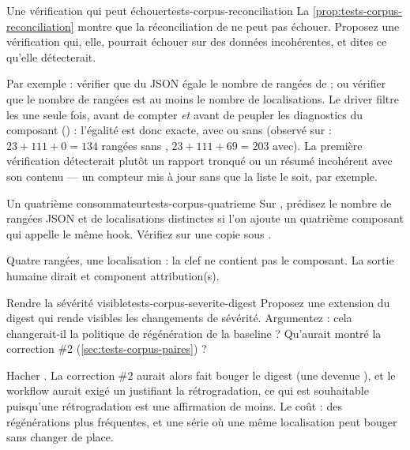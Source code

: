 \begin{exercice}{Une vérification qui peut échouer}{tests-corpus-reconciliation}
La \cref{prop:tests-corpus-reconciliation} montre que la réconciliation de  ne peut pas échouer. Proposez une vérification qui, elle, pourrait échouer sur des données incohérentes, et dites ce qu'elle détecterait.
\end{exercice}
\begin{solution}
Par exemple : vérifier que  du JSON égale le nombre de rangées de  ; ou vérifier que le nombre de rangées est au moins le nombre de localisations. Le driver filtre les \Info{} une seule fois, avant de compter \emph{et} avant de peupler les diagnostics du composant () : l'égalité est donc exacte, avec ou sans  (observé sur  : $23+111+0=134$ rangées sans , $23+111+69=203$ avec). La première vérification détecterait plutôt un rapport tronqué ou un résumé incohérent avec son contenu — un compteur mis à jour sans que la liste le soit, par exemple.
\end{solution}

\begin{exercice}{Un quatrième consommateur}{tests-corpus-quatrieme}
Sur , prédisez le nombre de rangées JSON et de localisations distinctes si l'on ajoute un quatrième composant qui appelle le même hook. Vérifiez sur une copie sous .
\end{exercice}
\begin{solution}
Quatre rangées, une localisation : la clef ne contient pas le composant. La sortie humaine dirait \og [in 4 components]\fg{} et  component attribution(s)\fg{}.
\end{solution}

\begin{exercice}{Rendre la sévérité visible}{tests-corpus-severite-digest}
Proposez une extension du digest qui rende visibles les changements de sévérité. Argumentez : cela changerait-il la politique de régénération de la baseline ? Qu'aurait montré la correction \#2 (\cref{sec:tests-corpus-paires}) ?
\end{exercice}
\begin{solution}
Hacher . La correction \#2 aurait alors fait bouger le digest (une \Error{} devenue \Warning{}), et le workflow aurait exigé un  justifiant la rétrogradation, ce qui est souhaitable puisqu'une rétrogradation est une affirmation de moins. Le coût : des régénérations plus fréquentes, et une série où une même localisation peut \og bouger\fg{} sans changer de place.
\end{solution}

